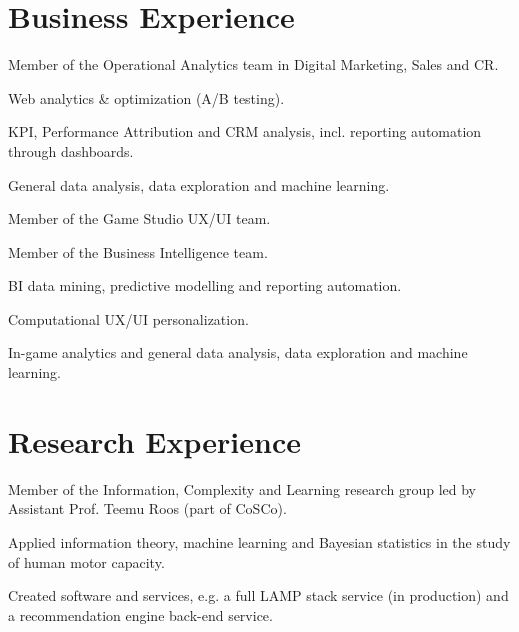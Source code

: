 \documentclass[]{deedy-resume-openfont}
\begin{document}
\begin{minipage}[t]{0.66\textwidth} 


\section{Business Experience}
\vspace{\topsep}
\begin{tightemize}
\item Member of the Operational Analytics team in Digital Marketing, Sales and CR.
\item Web analytics \& optimization (A/B testing).
\item KPI, Performance Attribution and CRM analysis, incl. reporting automation through dashboards.
\item General data analysis, data exploration and machine learning.
\end{tightemize}

\begin{tightemize}
\item Member of the Game Studio UX/UI team.
\item Member of the Business Intelligence team.
\item BI data mining, predictive modelling and reporting automation.
\item Computational UX/UI personalization.
\item In-game analytics and general data analysis, data exploration and machine learning.
\end{tightemize}


\section{Research Experience}
\begin{tightemize}
\item Member of the Information, Complexity and Learning research group led by Assistant Prof. Teemu Roos (part of CoSCo).
\item Applied information theory, machine learning and Bayesian statistics in the study of human motor capacity.
\item Created software and services, e.g. a full LAMP stack service (in production) and a recommendation engine back-end service.
\end{tightemize}


\end{minipage}
\end{document}
